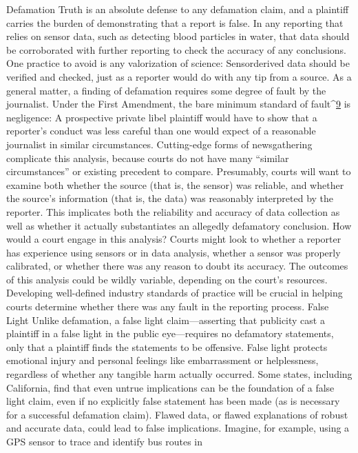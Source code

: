 Defamation
Truth is an absolute defense to any defamation claim, and a plaintiff carries
the burden of demonstrating that a report is false. In any reporting that
relies on sensor data, such as detecting blood particles in water, that data
should be corroborated with further reporting to check the accuracy of any
conclusions. One practice to avoid is any valorization of science: Sensorderived
data should be verified and checked, just as a reporter would do
with any tip from a source.
As a general matter, a finding of defamation requires some degree of fault by
the journalist. Under the First Amendment, the bare minimum standard of
fault^{\href{#endnotes-syed}{9}} is negligence: A prospective private libel plaintiff would have to show
that a reporter's conduct was less careful than one would expect of a reasonable
journalist in similar circumstances. Cutting-edge forms of newsgathering
complicate this analysis, because courts do not have many ``similar
circumstances'' or existing precedent to compare. Presumably, courts will
want to examine both whether the source (that is, the sensor) was reliable,
and whether the source's information (that is, the data) was reasonably
interpreted by the reporter. This implicates both the reliability and accuracy
of data collection as well as whether it actually substantiates an allegedly
defamatory conclusion.
How would a court engage in this analysis? Courts might look to whether
a reporter has experience using sensors or in data analysis, whether a sensor
was properly calibrated, or whether there was any reason to doubt its
accuracy. The outcomes of this analysis could be wildly variable, depending on the court's resources. Developing well-defined industry standards of
practice will be crucial in helping courts determine whether there was any
fault in the reporting process.
False Light
Unlike defamation, a false light claim—asserting that publicity cast a plaintiff
in a false light in the public eye—requires no defamatory statements,
only that a plaintiff finds the statements to be offensive. False light protects
emotional injury and personal feelings like embarrassment or helplessness,
regardless of whether any tangible harm actually occurred. Some states,
including California, find that even untrue implications can be the foundation
of a false light claim, even if no explicitly false statement has been made
(as is necessary for a successful defamation claim). Flawed data, or flawed
explanations of robust and accurate data, could lead to false implications.
Imagine, for example, using a GPS sensor to trace and identify bus routes in
